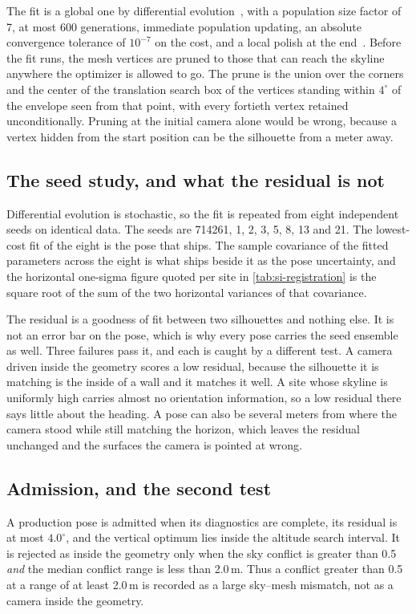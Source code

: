 \documentclass[journal]{IEEEtran}
\begin{document}
The fit is a global one by differential evolution~\cite{storn}, with a
population size factor of 7, at most 600 generations, immediate population
updating, an absolute convergence tolerance of $10^{-7}$ on the cost, and a
local polish at the end~\cite{scipy}. Before the fit runs, the mesh vertices are
pruned to those that can reach the skyline anywhere the optimizer is allowed to
go. The prune is the union over the corners and the center of the translation
search box of the vertices standing within $4^\circ$ of the envelope seen from
that point, with every fortieth vertex retained unconditionally. Pruning at the
initial camera alone would be wrong, because a vertex hidden from the start
position can be the silhouette from a meter away.

\subsection{The seed study, and what the residual is not}

Differential evolution is stochastic, so the fit is repeated from eight
independent seeds on identical data. The seeds are 714261, 1, 2, 3, 5, 8, 13 and
21. The lowest-cost fit of the eight is the pose that ships. The sample
covariance of the fitted parameters across the eight is what ships beside it as
the pose uncertainty, and the horizontal one-sigma figure quoted per site in
\cref{tab:si-registration} is the square root of the sum of the two horizontal
variances of that covariance.

The residual is a goodness of fit between two silhouettes and nothing else. It
is not an error bar on the pose, which is why every pose carries the seed
ensemble as well. Three failures pass it, and each is caught by a different
test. A camera driven inside the geometry scores a low residual, because the
silhouette it is matching is the inside of a wall and it matches it well. A site
whose skyline is uniformly high carries almost no orientation information, so a
low residual there says little about the heading. A pose can also be several
meters from where the camera stood while still matching the horizon, which
leaves the residual unchanged and the surfaces the camera is pointed at wrong.

\subsection{Admission, and the second test}

A production pose is admitted when its diagnostics are complete, its residual
is at most $4.0^\circ$, and the vertical optimum lies inside the altitude search
interval. It is rejected as inside the geometry only when the sky conflict is
greater than 0.5 \emph{and} the median conflict range is less than 2.0\,m.
Thus a conflict greater than 0.5 at a range of at least 2.0\,m is recorded as a
large sky--mesh mismatch, not as a camera inside the geometry.
\end{document}
